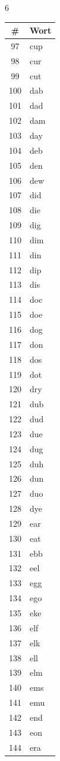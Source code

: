 \documentclass[11pt,a4paper]{article}
\begin{document}
\begin{multicols}{6}
\columnbreak

\begin{tabular}{cl}
\toprule
\# & Wort \\
\midrule
97 & cup \\
98 & cur \\
99 & cut \\
100 & dab \\
101 & dad \\
102 & dam \\
103 & day \\
104 & deb \\
105 & den \\
106 & dew \\
107 & did \\
108 & die \\
109 & dig \\
110 & dim \\
111 & din \\
112 & dip \\
113 & dis \\
114 & doc \\
115 & doe \\
116 & dog \\
117 & don \\
118 & dos \\
119 & dot \\
120 & dry \\
121 & dub \\
122 & dud \\
123 & due \\
124 & dug \\
125 & duh \\
126 & dun \\
127 & duo \\
128 & dye \\
129 & ear \\
130 & eat \\
131 & ebb \\
132 & eel \\
133 & egg \\
134 & ego \\
135 & eke \\
136 & elf \\
137 & elk \\
138 & ell \\
139 & elm \\
140 & ems \\
141 & emu \\
142 & end \\
143 & eon \\
144 & era \\
\bottomrule
\end{tabular}


\end{multicols}
\end{document}
